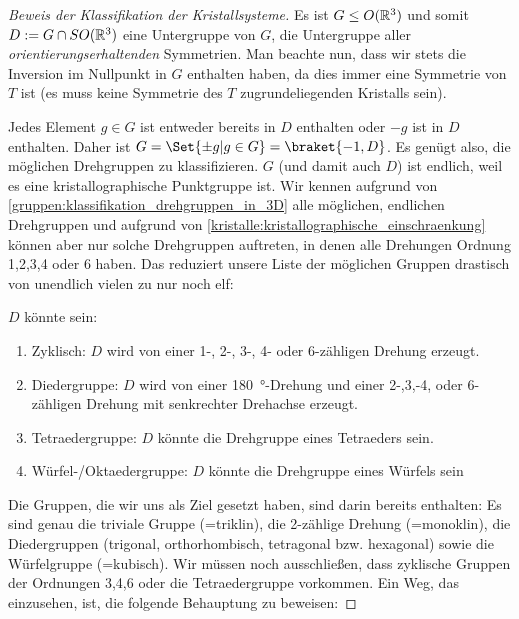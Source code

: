 \begin{proof}[Beweis der Klassifikation der Kristallsysteme]
Es ist $G\leq O(\mathbb{R}^3)$ und somit $D:=G\cap SO(\mathbb{R}^3)$ eine Untergruppe von $G$, die Untergruppe aller \emph{orientierungserhaltenden} Symmetrien. Man beachte nun, dass wir stets die Inversion im Nullpunkt in $G$ enthalten haben, da dies immer eine Symmetrie von $T$ ist (es muss keine Symmetrie des $T$ zugrundeliegenden Kristalls sein).

Jedes Element $g\in G$ ist entweder bereits in $D$ enthalten oder $-g$ ist in $D$ enthalten. Daher ist $G=\Set{\pm g | g\in G} = \braket{-1,D}$. Es genügt also, die möglichen Drehgruppen zu klassifizieren. $G$ (und damit auch $D$) ist endlich, weil es eine kristallographische Punktgruppe ist. Wir kennen aufgrund von \ref{gruppen:klassifikation_drehgruppen_in_3D} alle möglichen, endlichen Drehgruppen und aufgrund von \ref{kristalle:kristallographische_einschraenkung} können aber nur solche Drehgruppen auftreten, in denen alle Drehungen Ordnung 1,2,3,4 oder 6 haben. Das reduziert unsere Liste der möglichen Gruppen drastisch von unendlich vielen zu nur noch elf:

$D$ könnte sein:
\begin{enumerate}
\item Zyklisch: $D$ wird von einer 1-, 2-, 3-, 4- oder 6-zähligen Drehung erzeugt.
\item Diedergruppe: $D$ wird von einer \SI{180}{\degree}-Drehung und einer 2-,3,-4, oder 6-zähligen Drehung mit senkrechter Drehachse erzeugt.
\item Tetraedergruppe: $D$ könnte die Drehgruppe eines Tetraeders sein.
\item Würfel-/Oktaedergruppe: $D$ könnte die Drehgruppe eines Würfels sein
\end{enumerate}

Die Gruppen, die wir uns als Ziel gesetzt haben, sind darin bereits enthalten: Es sind genau die triviale Gruppe (=triklin), die 2-zählige Drehung (=monoklin), die Diedergruppen (trigonal, orthorhombisch, tetragonal bzw. hexagonal) sowie die Würfelgruppe (=kubisch). Wir müssen noch ausschließen, dass zyklische Gruppen der Ordnungen 3,4,6 oder die Tetraedergruppe vorkommen. Ein Weg, das einzusehen, ist, die folgende Behauptung zu beweisen:

\medbreak
{}


\end{proof}
